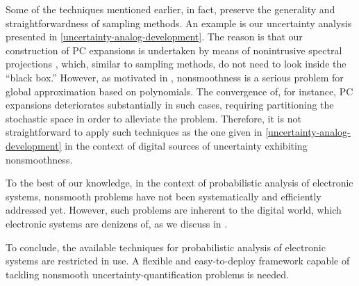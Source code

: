 Some of the techniques mentioned earlier, in fact, preserve the generality and
straightforwardness of sampling methods. An example is our uncertainty analysis
presented in \cref{uncertainty-analog-development}. The reason is that our
construction of \ac{PC} expansions is undertaken by means of nonintrusive
spectral projections \cite{xiu2010}, which, similar to sampling methods, do not
need to look inside the ``black box.'' However, as motivated in
, nonsmoothness is a serious problem for global
approximation based on polynomials. The convergence of, for instance, \ac{PC}
expansions deteriorates substantially in such cases, requiring partitioning the
stochastic space in order to alleviate the problem. Therefore, it is not
straightforward to apply such techniques as the one given in
\cref{uncertainty-analog-development} in the context of digital sources of
uncertainty exhibiting nonsmoothness.

To the best of our knowledge, in the context of probabilistic analysis of
electronic systems, nonsmooth problems have not been systematically and
efficiently addressed yet. However, such problems are inherent to the digital
world, which electronic systems are denizens of, as we discuss in
.

To conclude, the available techniques for probabilistic analysis of electronic
systems are restricted in use. A flexible and easy-to-deploy framework capable
of tackling nonsmooth uncertainty-quantification problems is needed.
